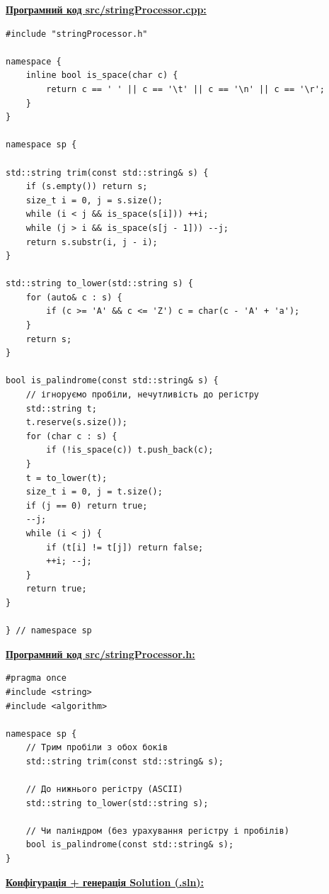 \documentclass[a4paper,12pt]{article}
\begin{document}
    \textbf{\underline{Програмний код src/stringProcessor.cpp:}}

    \begin{verbatim}
#include "stringProcessor.h"

namespace {
    inline bool is_space(char c) {
        return c == ' ' || c == '\t' || c == '\n' || c == '\r';
    }
}

namespace sp {

std::string trim(const std::string& s) {
    if (s.empty()) return s;
    size_t i = 0, j = s.size();
    while (i < j && is_space(s[i])) ++i;
    while (j > i && is_space(s[j - 1])) --j;
    return s.substr(i, j - i);
}

std::string to_lower(std::string s) {
    for (auto& c : s) {
        if (c >= 'A' && c <= 'Z') c = char(c - 'A' + 'a');
    }
    return s;
}

bool is_palindrome(const std::string& s) {
    // ігноруємо пробіли, нечутливість до регістру
    std::string t;
    t.reserve(s.size());
    for (char c : s) {
        if (!is_space(c)) t.push_back(c);
    }
    t = to_lower(t);
    size_t i = 0, j = t.size();
    if (j == 0) return true;
    --j;
    while (i < j) {
        if (t[i] != t[j]) return false;
        ++i; --j;
    }
    return true;
}

} // namespace sp
    \end{verbatim}

    \textbf{\underline{Програмний код src/stringProcessor.h:}}

    \begin{verbatim}
#pragma once
#include <string>
#include <algorithm>

namespace sp {
    // Трим пробіли з обох боків
    std::string trim(const std::string& s);

    // До нижнього регістру (ASCII)
    std::string to_lower(std::string s);

    // Чи паліндром (без урахування регістру і пробілів)
    bool is_palindrome(const std::string& s);
}
    \end{verbatim}

    \textbf{\underline{Конфігурація + генерація Solution (.sln):}}
\end{document}
